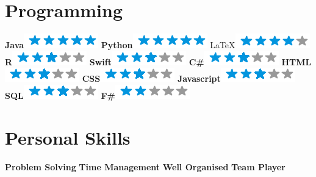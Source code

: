 \documentclass[]{friggeri-cv}
\begin{document}
\begin{aside}
  \section{Programming}
    \textbf{Java}\includegraphics[scale=0.40]{img/5stars.png}
    \textbf{Python}\includegraphics[scale=0.40]{img/5stars.png}
    \LaTeX \includegraphics[scale=0.40]{img/4stars.png}
    \textbf{R}\includegraphics[scale=0.40]{img/3stars.png}
    \textbf{Swift}\includegraphics[scale=0.40]{img/3stars.png}
    \textbf{C\#}\includegraphics[scale=0.40]{img/3stars.png}
    \textbf{HTML}\includegraphics[scale=0.40]{img/3stars.png}
    \textbf{CSS}\includegraphics[scale=0.40]{img/3stars.png}
    \textbf{Javascript}\includegraphics[scale=0.40]{img/3stars.png}
    \textbf{SQL}\includegraphics[scale=0.40]{img/3stars.png}    
    \textbf{F\#}\includegraphics[scale=0.40]{img/2stars.png}
    ~
  \section{Personal Skills}
    \textbf{Problem Solving}
    \textbf{Time Management}
    \textbf{Well Organised}
    \textbf{Team Player}    
    ~
\end{aside}
~
\end{document}
